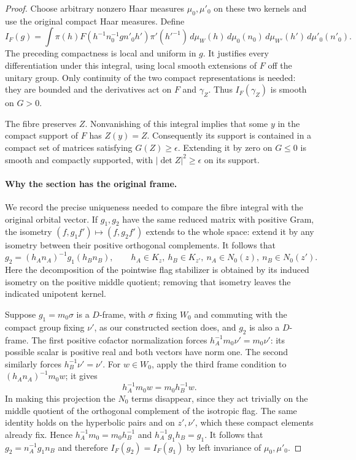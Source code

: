 \begin{proof}
Choose arbitrary nonzero Haar measures $\mu_0,\mu'_0$ on these
two kernels and use the original compact Haar measures.  Define
\begin{equation}\label{unitary-density-fibre-integral}
 I_F(g)=\int
 \pi(h)F(h^{-1}n_0^{-1}g n'_0h')\pi'(h'^{-1})
           \,d\mu_W(h)\,d\mu_0(n_0)
                 \,d\mu_{W'}(h')\,d\mu'_0(n'_0).
\end{equation}
The preceding compactness is local and uniform in $g$.  It
justifies every differentiation under this integral, using
local smooth extensions of $F$ off the unitary group.  Only
continuity of the two compact representations is needed: they
are bounded and the derivatives act on $F$ and $\gamma_Z$.
Thus $I_F(\gamma_Z)$ is smooth on $G>0$.

The fibre preserves $Z$.  Nonvanishing of this integral implies
that some $y$ in the compact support of $F$ has $Z(y)=Z$.
Consequently its support is contained in a compact set of
matrices satisfying $G(Z)\ge\epsilon$.  Extending it by zero
on $G\le0$ is smooth and compactly supported, with
$|\det Z|^2\ge\epsilon$ on its support.

\paragraph{Why the section has the original frame.}
We record the precise uniqueness needed to compare the fibre
integral with the original orbital vector.  If $g_1,g_2$ have
the same reduced matrix with positive Gram, the isometry
$(f,g_1f')\mapsto(f,g_2f')$ extends to the whole space: extend
it by any isometry between their positive orthogonal
complements.  It follows that
\[
       g_2=(h_A n_A)^{-1}g_1(h_B n_B),
       \qquad h_A\in K_z,\ h_B\in K_{z'},\
                         n_A\in N_0(z),\ n_B\in N_0(z').
\]
Here the decomposition of the pointwise flag stabilizer is
obtained by its induced isometry on the positive middle
quotient; removing that isometry leaves the indicated
unipotent kernel.

Suppose $g_1=m_0\sigma$ is a $D$-frame, with $\sigma$ fixing
$W_0$ and commuting with the compact group fixing $\nu'$, as
our constructed section does, and $g_2$ is also a $D$-frame.
The first positive cofactor normalization forces
$h_A^{-1}m_0\nu'=m_0\nu'$: its possible scalar is positive
real and both vectors have norm one.  The second similarly
forces $h_B^{-1}\nu'=\nu'$.  For $w\in W_0$, apply the third
frame condition to $(h_A n_A)^{-1}m_0w$; it gives
\[
       h_A^{-1}m_0w=m_0h_B^{-1}w.
\]
In making this projection the $N_0$ terms disappear, since
they act trivially on the middle quotient of the orthogonal
complement of the isotropic flag.  The same identity holds on
the hyperbolic pairs and on $z',\nu'$, which these compact
elements already fix.  Hence $h_A^{-1}m_0=m_0h_B^{-1}$ and
$h_A^{-1}g_1h_B=g_1$.  It follows that
$g_2=n_A^{-1}g_1n_B$ and therefore $I_F(g_2)=I_F(g_1)$ by
left invariance of $\mu_0,\mu'_0$.


\end{proof}

